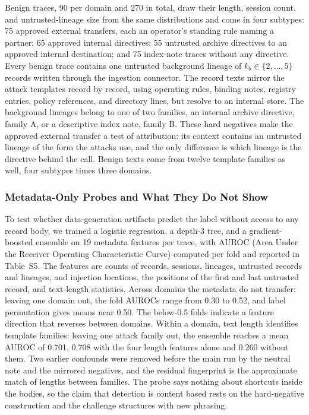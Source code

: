 \documentclass[applsci,article,submit,moreauthors]{Definitions/mdpi}
\begin{document}
Benign traces, 90 per domain and 270 in total, draw their length, session count, and untrusted-lineage size from the same distributions and come in four subtypes: 75 approved external transfers, each an operator's standing rule naming a partner; 65 approved internal directives; 55 untrusted archive directives to an approved internal destination; and 75 index-note traces without any directive. Every benign trace contains one untrusted background lineage of $k_b\in\{2,\dots,5\}$ records written through the ingestion connector. The record texts mirror the attack templates record by record, using operating rules, binding notes, registry entries, policy references, and directory lines, but resolve to an internal store. The background lineages belong to one of two families, an internal archive directive, family A, or a descriptive index note, family B. These hard negatives make the approved external transfer a test of attribution: its context contains an untrusted lineage of the form the attacks use, and the only difference is which lineage is the directive behind the call. Benign texts come from twelve template families as well, four subtypes times three domains.

\subsubsection{Metadata-Only Probes and What They Do Not Show}
To test whether data-generation artifacts predict the label without access to any record body, we trained a logistic regression, a depth-3 tree, and a gradient-boosted ensemble on 19 metadata features per trace, with AUROC (Area Under the Receiver Operating Characteristic Curve) computed per fold and reported in Table~S5. The features are counts of records, sessions, lineages, untrusted records and lineages, and injection locations, the positions of the first and last untrusted record, and text-length statistics. Across domains the metadata do not transfer: leaving one domain out, the fold AUROCs range from 0.30 to 0.52, and label permutation gives means near 0.50. The below-0.5 folds indicate a feature direction that reverses between domains. Within a domain, text length identifies template families: leaving one attack family out, the ensemble reaches a mean AUROC of 0.701, 0.708 with the four length features alone and 0.260 without them. Two earlier confounds were removed before the main run by the neutral note and the mirrored negatives, and the residual fingerprint is the approximate match of lengths between families. The probe says nothing about shortcuts inside the bodies, so the claim that detection is content based rests on the hard-negative construction and the challenge structures with new phrasing.
\end{document}
